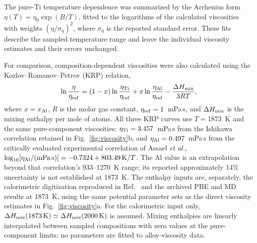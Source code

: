 The pure-Ti temperature dependence was summarized by the Arrhenius form $\eta(T)=\eta_0\exp(B/T)$, fitted to the logarithms of the calculated viscosities with weights $(\eta/\sigma_\eta)^2$, where $\sigma_\eta$ is the reported standard error.
These fits describe the sampled temperature range and leave the individual viscosity estimates and their errors unchanged.

For comparison, composition-dependent viscosities were also calculated using the Kozlov--Romanov--Petrov (KRP) relation,\cite{Kozlov1983}
\begin{equation}
 \ln\frac{\eta}{\eta_{\rm ref}}=(1-x)\ln\frac{\eta_{\rm Ti}}{\eta_{\rm ref}}
 +x\ln\frac{\eta_{\rm Al}}{\eta_{\rm ref}}
 -\frac{\Delta H_{\rm mix}}{3RT},
 \label{eq:krp}
\end{equation}
where $x=x_{\rm Al}$, $R$ is the molar gas constant, $\eta_{\rm ref}=1$~mPa\,s, and $\Delta H_{\rm mix}$ is the mixing enthalpy per mole of atoms.
All three KRP curves use $T=1873$~K and the same pure-component viscosities: $\eta_{\rm Ti}=3.457$~mPa\,s from the Ishikawa correlation retained in Fig.~\ref{fig:viscosity}b,\cite{Ishikawa2012} and $\eta_{\rm Al}=0.497$~mPa\,s from the critically evaluated experimental correlation of Assael \textit{et al.},\cite{Assael2006} $\log_{10}[\eta_{\rm Al}/(\mathrm{mPa\,s})]=-0.7324+803.49\,\mathrm{K}/T$.
The Al value is an extrapolation beyond that correlation's 933--1270~K range; its reported approximately 14\% uncertainty is not established at 1873~K.
The enthalpy inputs are, separately, the calorimetric digitization reproduced in Ref.~ and the archived PBE and \rscan{} MD results at 1873~K, using the same potential parameter sets as the direct viscosity estimates in Fig.~\ref{fig:viscosity}a.
For the calorimetric input only, $\Delta H_{\rm mix}(1873\,\mathrm{K})\simeq\Delta H_{\rm mix}(2000\,\mathrm{K})$ is assumed.
Mixing enthalpies are linearly interpolated between sampled compositions with zero values at the pure-component limits; no parameters are fitted to alloy-viscosity data.
